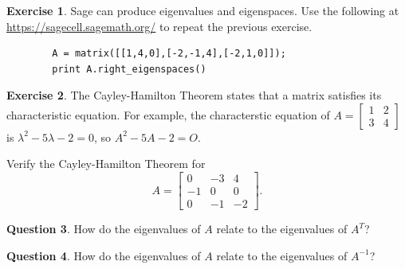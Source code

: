 \documentclass{beamer}
\newcommand{\fn}{\insertframenumber}
\theoremstyle{definition}
\newtheorem{exercise}{Exercise}
\newtheorem{question}[exercise]{Question}
\begin{document}
\begin{frame}[fragile]
	\frametitle{\fn}
	\begin{exercise}
		Sage can produce eigenvalues and eigenspaces. Use the following at \url{https://sagecell.sagemath.org/} to repeat the previous exercise.
		\begin{verbatim}
		A = matrix([[1,4,0],[-2,-1,4],[-2,1,0]]);
		print A.right_eigenspaces()
		\end{verbatim}
	\end{exercise}
\end{frame}
\begin{frame}
	\begin{exercise}
		The Cayley-Hamilton Theorem states that a matrix satisfies its characteristic equation.  For example, the characterstic equation of $A=\begin{bmatrix}1&2\\3&4\end{bmatrix}$ is $\lambda ^2-5\lambda-2=0$, so $A^2-5A-2=O$.
		
		Verify the Cayley-Hamilton Theorem for 
			\[A=\begin{bmatrix}
			0 & -3 & 4 \\
			-1 & 0 & 0 \\
			0 & -1 & -2
			\end{bmatrix}\!.\]
	\end{exercise}
\end{frame}
\begin{frame}{\fn}
	\begin{question}
		How do the eigenvalues of $A$ relate to the eigenvalues of $A^T$?
	\end{question}
	\begin{question}
		How do the eigenvalues of $A$ relate to the eigenvalues of $A^{-1}$?
	\end{question}
\end{frame}
\end{document}
